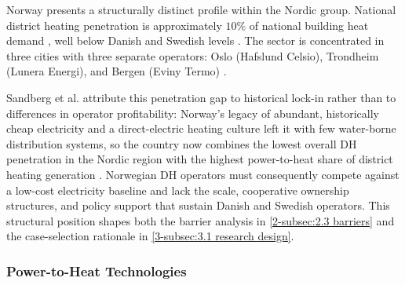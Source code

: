 Norway presents a structurally distinct profile within the Nordic group. National district heating penetration is approximately $10\%$ of national building heat demand \cite{SINTEF_energy_2023}, well below Danish and Swedish levels \cite{sandberg_framework_2018}. The sector is concentrated in three cities with three separate operators: Oslo (Hafslund Celsio), Trondheim (Lunera Energi), and Bergen (Eviny Termo) \cite{norsk_fjernvarme_fjernkontrollenno_nodate}.

Sandberg et al. attribute this penetration gap to historical lock-in rather than to differences in operator profitability: Norway's legacy of abundant, historically cheap electricity and a direct-electric heating culture left it with few water-borne distribution systems, so the country now combines the lowest overall DH penetration in the Nordic region with the highest power-to-heat share of district heating generation \cite{sandberg_framework_2018}. Norwegian DH operators must consequently compete against a low-cost electricity baseline and lack the scale, cooperative ownership structures, and policy support that sustain Danish and Swedish operators. This structural position shapes both the barrier analysis in \autoref{2-subsec:2.3 barriers} and the case-selection rationale in \autoref{3-subsec:3.1 research design}.


\subsubsection{Power-to-Heat Technologies}
\label{2-subsec:2.2.2 P2H technologies}

